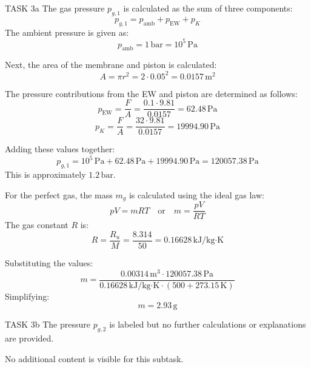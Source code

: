TASK 3a  
The gas pressure \( p_{g,1} \) is calculated as the sum of three components:  
\[
p_{g,1} = p_{\text{amb}} + p_{\text{EW}} + p_{K}
\]  
The ambient pressure is given as:  
\[
p_{\text{amb}} = 1 \, \text{bar} = 10^5 \, \text{Pa}
\]  

Next, the area of the membrane and piston is calculated:  
\[
A = \pi r^2 = 2 \cdot 0.05^2 = 0.0157 \, \text{m}^2
\]  

The pressure contributions from the EW and piston are determined as follows:  
\[
p_{\text{EW}} = \frac{F}{A} = \frac{0.1 \cdot 9.81}{0.0157} = 62.48 \, \text{Pa}
\]  
\[
p_{K} = \frac{F}{A} = \frac{32 \cdot 9.81}{0.0157} = 19994.90 \, \text{Pa}
\]  

Adding these values together:  
\[
p_{g,1} = 10^5 \, \text{Pa} + 62.48 \, \text{Pa} + 19994.90 \, \text{Pa} = 120057.38 \, \text{Pa}
\]  
This is approximately \( 1.2 \, \text{bar} \).  

For the perfect gas, the mass \( m_g \) is calculated using the ideal gas law:  
\[
pV = mRT \quad \text{or} \quad m = \frac{pV}{RT}
\]  
The gas constant \( R \) is:  
\[
R = \frac{R_u}{M} = \frac{8.314}{50} = 0.16628 \, \text{kJ/kg·K}
\]  

Substituting the values:  
\[
m = \frac{0.00314 \, \text{m}^3 \cdot 120057.38 \, \text{Pa}}{0.16628 \, \text{kJ/kg·K} \cdot (500 + 273.15 \, \text{K})}
\]  
Simplifying:  
\[
m = 2.93 \, \text{g}
\]  

TASK 3b  
The pressure \( p_{g,2} \) is labeled but no further calculations or explanations are provided.  

No additional content is visible for this subtask.